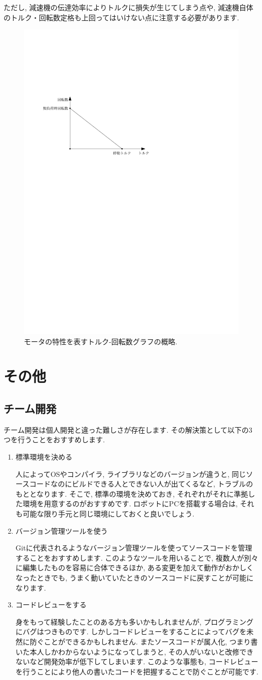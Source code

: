 ただし, 減速機の伝達効率によりトルクに損失が生じてしまう点や, 減速機自体のトルク・回転数定格も上回ってはいけない点に注意する必要があります. 
\begin{figure}[t]
    \centering
    \includegraphics[width=0.5\hsize]{control/fig/motor.pdf}
    \caption{モータの特性を表すトルク-回転数グラフの概略.}
    \label{fig:motor}
\end{figure}

\section{その他}
\subsection{チーム開発}
チーム開発は個人開発と違った難しさが存在します. 
その解決策として以下の3つを行うことをおすすめします. 
\begin{enumerate}
    \item 標準環境を決める
    \par
    人によってOSやコンパイラ, ライブラリなどのバージョンが違うと, 同じソースコードなのにビルドできる人とできない人が出てくるなど, トラブルのもととなります. 
    そこで, 標準の環境を決めておき, それぞれがそれに準拠した環境を用意するのがおすすめです. 
    ロボットにPCを搭載する場合は, それも可能な限り手元と同じ環境にしておくと良いでしょう. 
    \item バージョン管理ツールを使う
    \par
    Gitに代表されるようなバージョン管理ツールを使ってソースコードを管理することをおすすめします. 
    このようなツールを用いることで, 複数人が別々に編集したものを容易に合体できるほか, ある変更を加えて動作がおかしくなったときでも, うまく動いていたときのソースコードに戻すことが可能になります. 
    \item コードレビューをする
    \par
    身をもって経験したことのある方も多いかもしれませんが, プログラミングにバグはつきものです. 
    しかしコードレビューをすることによってバグを未然に防ぐことができるかもしれません. 
    またソースコードが属人化, つまり書いた本人しかわからないようになってしまうと, その人がいないと改修できないなど開発効率が低下してしまいます. 
    このような事態も, コードレビューを行うことにより他人の書いたコードを把握することで防ぐことが可能です. 
\end{enumerate}
